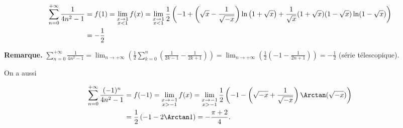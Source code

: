 {{\begin{align*}\ensuremath
 \sum_{n=0}^{+\infty}\frac{1}{4n^2-1}&=f(1)=\displaystyle\lim_{\substack{x\rightarrow1\\ x<1}}f(x)
=\displaystyle\lim_{\substack{x\rightarrow1\\ x<1}}\frac{1}{2}\left(-1+\left(\sqrt{x}-\frac{1}{\sqrt{-x}} \right)\ln\left(1+\sqrt{x}\right) +\frac{1}{\sqrt{x}}(1+\sqrt{x})(1-\sqrt{x})\ln(1-\sqrt{x})\right)\\
 &=-\frac{1}{2}
\end{align*} 
			

\textbf{Remarque.} $\sum_{n=0}^{+\infty}\frac{1}{4n^2-1}=\lim_{n \rightarrow +\infty}\left(\frac{1}{2}\sum_{k=0}^{n}\left(\frac{1}{2k-1}-\frac{1}{2k+1}\right)\right)=\lim_{n \rightarrow +\infty}\left(\frac{1}{2}\left(-1-\frac{1}{2n+1}\right)\right)=-\frac{1}{2}$ (série télescopique).

On a aussi

\begin{align*}\ensuremath
 \sum_{n=0}^{+\infty}\frac{(-1)^n}{4n^2-1}&=f(-1)=\displaystyle\lim_{\substack{x\rightarrow-1\\ x>-1}}f(x)
=\displaystyle\lim_{\substack{x\rightarrow-1\\ x>-1}}\frac{1}{2}\left(-1-\left(\sqrt{-x}+\frac{1}{\sqrt{-x}} \right)\Arctan(\sqrt{-x})\right)\\
 &=\frac{1}{2}\left(-1-2\Arctan1\right)=-\frac{\pi+2}{4}.
\end{align*}}
}